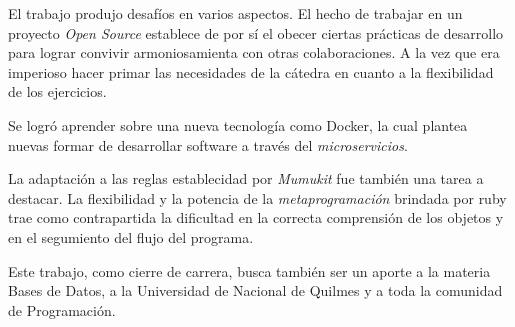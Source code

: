 
El trabajo produjo desafíos en varios aspectos.
El hecho de trabajar en un proyecto \textit{Open Source}
establece de por sí el obecer ciertas prácticas de desarrollo
para lograr convivir armoniosamienta con otras colaboraciones.
A la vez que era imperioso hacer primar las necesidades
de la cátedra en cuanto a la flexibilidad de los ejercicios.

Se logró aprender sobre una nueva tecnología como Docker,
la cual plantea nuevas formar de desarrollar software
a través del \textit{microservicios}.

La adaptación a las reglas establecidad por \textit{Mumukit}
fue también una tarea a destacar. La flexibilidad y la potencia
de la \textit{metaprogramación} brindada por ruby
trae como contrapartida la dificultad
en la correcta comprensión de los objetos y en el segumiento del flujo
del programa.

Este trabajo, como cierre de carrera, busca también ser un aporte
a la materia Bases de Datos, a la Universidad de Nacional de Quilmes
y a toda la comunidad de Programación.
